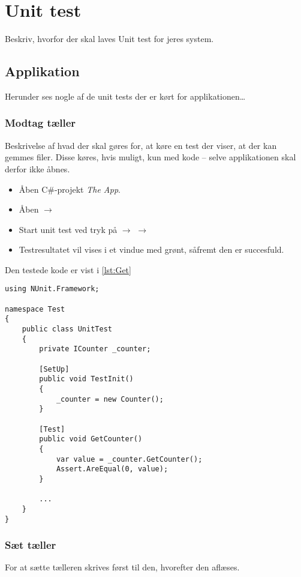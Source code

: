 \documentclass[Main]{subfiles}
\begin{document}
\chapter{Unit test}
Beskriv, hvorfor der skal laves Unit test for jeres system.

\section{Applikation}
Herunder ses nogle af de unit tests der er kørt for applikationen\dots

\subsection{Modtag tæller}
Beskrivelse af hvad der skal gøres for, at køre en test der viser, at der kan gemmes filer. 
Disse køres, hvis muligt, kun med kode -- selve applikationen skal derfor ikke åbnes.

\begin{itemize}
\item Åben C\#-projekt \textit{The App}.
\item Åben  $\rightarrow$ 
\item Start unit test ved tryk på  $\rightarrow$  $\rightarrow$ 
\item Testresultatet vil vises i et vindue med grønt, såfremt den er succesfuld.
\end{itemize}

Den testede kode er vist i \codeTitle \ref{lst:Get}

\begin{lstlisting}[caption=Returnering af counter, style=Code-C++, label=lst:Get]
using NUnit.Framework;

namespace Test
{
	public class UnitTest
	{
		private ICounter _counter;

		[SetUp]
		public void TestInit()
		{	
			_counter = new Counter();
		}

		[Test]
		public void GetCounter()
		{
			var value = _counter.GetCounter();
			Assert.AreEqual(0, value);
		}
		
		...
	}
}
\end{lstlisting}



\subsection{Sæt tæller}
For at sætte tælleren skrives først til den, hvorefter den aflæses.
\end{document}

